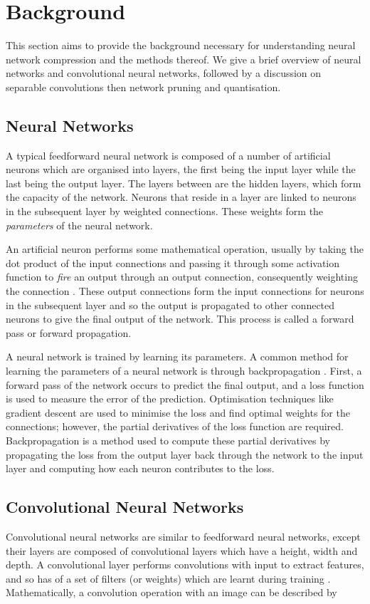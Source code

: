 \documentclass[conference]{IEEEtran}
\begin{document}
\section{Background}
This section aims to provide the background necessary for understanding neural network compression and the methods thereof. We give a brief overview of neural networks and convolutional neural networks, followed by a discussion on separable convolutions then network pruning and quantisation.

\subsection{Neural Networks}

A typical feedforward neural network is composed of a number of artificial neurons which are organised into layers, the first being the input layer while the last being the output layer. The layers between are the hidden layers, which form the capacity of the network. Neurons that reside in a layer are linked to neurons in the subsequent layer by weighted connections. These weights form the \emph{parameters} of the neural network.

An artificial neuron performs some mathematical operation, usually by taking the dot product of the input connections and passing it through some activation function to \emph{fire} an output through an output connection, consequently weighting the connection \cite{Goodfellow-et-al-2016}. These output connections form the input connections for neurons in the subsequent layer and so the output is propagated to other connected neurons to give the final output of the network. This process is called a forward pass or forward propagation.

A neural network is trained by learning its parameters. A common method for learning the parameters of a neural network is through backpropagation \cite{rumelhart1988learning}. First, a forward pass of the network occurs to predict the final output, and a loss function is used to measure the error of the prediction. Optimisation techniques like gradient descent are used to minimise the loss and find optimal weights for the connections; however, the partial derivatives of the loss function are required. Backpropagation is a method used to compute these partial derivatives by propagating the loss from the output layer back through the network to the input layer and computing how each neuron contributes to the loss.


\subsection{Convolutional Neural Networks}
Convolutional neural networks are similar to feedforward neural networks, except their layers are composed of convolutional layers which have a height, width and depth. A convolutional layer performs convolutions with input to extract features, and so has of a set of filters (or weights) which are learnt during training \cite{Goodfellow-et-al-2016}. Mathematically, a convolution operation with an image can be described by
\end{document}
